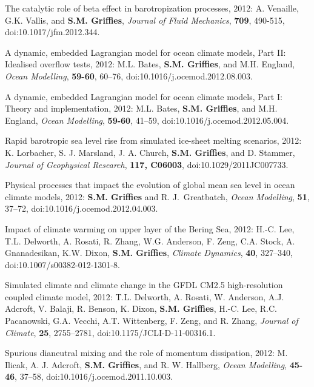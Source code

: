 \begin{etaremune}
\item The catalytic role of beta effect in barotropization processes,
  2012: A. Venaille, G.K. Vallis, and {\bf S.M. Griffies}, {\it
    Journal of Fluid Mechanics}, {\bf 709}, 490-515,
  doi:10.1017/jfm.2012.344.

\item A dynamic, embedded Lagrangian model for ocean climate models,
  Part II: Idealised overflow tests, 2012: M.L. Bates, {\bf
    S.M. Grif\/f\/ies}, and M.H. England, {\it Ocean Modelling}, {\bf
    59-60}, 60--76, doi:10.1016/j.ocemod.2012.08.003.

\item A dynamic, embedded Lagrangian model for ocean climate models,
  Part I: Theory and implementation, 2012: M.L. Bates, {\bf
    S.M. Grif\/f\/ies}, and M.H. England, {\it Ocean Modelling}, {\bf
    59-60}, 41--59, doi:10.1016/j.ocemod.2012.05.004.

\item Rapid barotropic sea level rise from simulated ice-sheet melting
  scenarios, 2012: K. Lorbacher, S. J. Marsland, J. A. Church, {\bf
    S.M. Griffies}, and D. Stammer, {\it Journal of Geophysical
    Research}, {\bf 117, C06003}, doi:10.1029/2011JC007733.

\item Physical processes that impact the evolution of global mean sea
  level in ocean climate models, 2012: {\bf S.M. Griffies} and R. J.\
  Greatbatch, {\it Ocean Modelling}, {\bf 51}, 37--72,
  doi:10.1016/j.ocemod.2012.04.003.

\item Impact of climate warming on upper layer of the Bering Sea,
  2012: H.-C. Lee, T.L. Delworth, A. Rosati, R. Zhang, W.G. Anderson,
  F. Zeng, C.A. Stock, A. Gnanadesikan, K.W. Dixon, {\bf
    S.M. Griffies}, {\it Climate Dynamics}, {\bf 40}, 327–340,
  doi:10.1007/s00382-012-1301-8.

\item Simulated climate and climate change in the GFDL CM2.5
  high-resolution coupled climate model, 2012: T.L. Delworth,
  A. Rosati, W. Anderson, A.J. Adcroft, V. Balaji, R. Benson,
  K. Dixon, {\bf S.M. Griffies}, H.-C. Lee, R.C. Pacanowski,
  G.A. Vecchi, A.T. Wittenberg, F. Zeng, and R. Zhang, {\it Journal of
    Climate}, {\bf 25}, 2755--2781, doi:10.1175/JCLI-D-11-00316.1.

\item Spurious dianeutral mixing and the role of momentum dissipation,
  2012: M. Ilicak, A. J. Adcroft, {\bf S.M. Griffies}, and
  R. W. Hallberg, {\it Ocean Modelling}, {\bf 45-46}, 37--58,
  doi:10.1016/j.ocemod.2011.10.003.


\end{etaremune}
